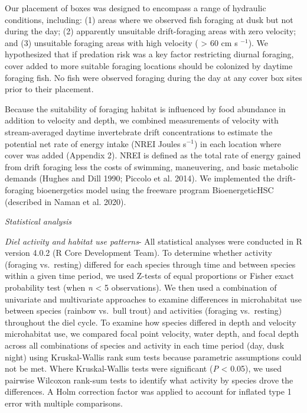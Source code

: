 \documentclass[]{article}
\begin{document}
Our placement of boxes was designed to encompass a range of hydraulic
conditions, including: (1) areas where we observed fish foraging at dusk
but not during the day; (2) apparently unsuitable drift-foraging areas
with zero velocity; and (3) unsuitable foraging areas with high velocity
( \textgreater{} 60 cm s \(^{-1}\)). We hypothesized that if predation
risk was a key factor restricting diurnal foraging, cover added to more
suitable foraging locations should be colonized by daytime foraging
fish. No fish were observed foraging during the day at any cover box
sites prior to their placement.

Because the suitability of foraging habitat is influenced by food
abundance in addition to velocity and depth, we combined measurements of
velocity with stream-averaged daytime invertebrate drift concentrations
to estimate the potential net rate of energy intake (NREI Joules
s\(^{-1}\)) in each location where cover was added (Appendix 2). NREI is
defined as the total rate of energy gained from drift foraging less the
costs of swimming, maneuvering, and basic metabolic demands (Hughes and
Dill 1990; Piccolo et al. 2014). We implemented the drift-foraging
bioenergetics model using the freeware program BioenergeticHSC
(described in Naman et al. 2020).

\emph{Statistical analysis}

\emph{Diel activity and habitat use patterns}- All statistical analyses
were conducted in R version 4.0.2 (R Core Development Team). To
determine whether activity (foraging vs.~resting) differed for each
species through time and between species within a given time period, we
used Z-tests of equal proportions or Fisher exact probability test (when
\emph{n} \textless{} 5 observations). We then used a combination of
univariate and multivariate approaches to examine differences in
microhabitat use between species (rainbow vs.~bull trout) and activities
(foraging vs.~resting) throughout the diel cycle. To examine how species
differed in depth and velocity microhabitat use, we compared focal point
velocity, water depth, and focal depth across all combinations of
species and activity in each time period (day, dusk night) using
Kruskal-Wallis rank sum tests because parametric assumptions could not
be met. Where Kruskal-Wallis tests were significant (\emph{P}
\textless{} 0.05), we used pairwise Wilcoxon rank-sum tests to identify
what activity by species drove the differences. A Holm correction factor
was applied to account for inflated type 1 error with multiple
comparisons.
\end{document}
